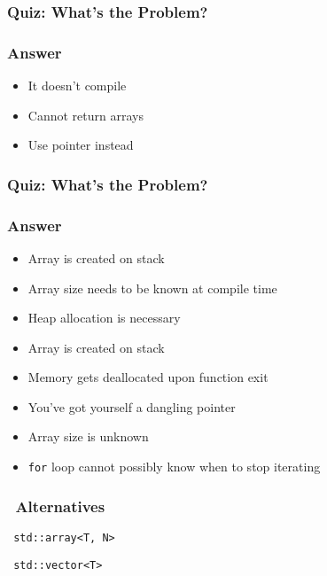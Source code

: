 \documentclass{../ucll-slides}
\begin{document}
\begin{frame}
  \frametitle{Quiz: What's the Problem?}
\end{frame}

\begin{frame}
  \frametitle{Answer}
  \begin{itemize}
    \item It doesn't compile
    \item Cannot return arrays
    \item Use pointer instead
   \end{itemize}
\end{frame}

\begin{frame}
  \frametitle{Quiz: What's the Problem?}
\end{frame}

\begin{frame}
  \frametitle{Answer}
  \begin{itemize}
    \item Array is created on stack
    \item Array size needs to be known at compile time
    \item Heap allocation is necessary
  \end{itemize}
  \vskip5mm
  \begin{itemize}
    \item Array is created on stack
    \item Memory gets deallocated upon function exit
    \item You've got yourself a dangling pointer
  \end{itemize}
  \vskip5mm
  \begin{itemize}
    \item Array size is unknown
    \item {\tt for} loop cannot possibly know when to stop iterating
  \end{itemize}
\end{frame}

\begin{frame}
  \frametitle{\cpp\ Alternatives}
  \begin{center} \tt
    std::array<T, N>
  \end{center}
  \vskip5mm
  \begin{center} \tt
    std::vector<T>
  \end{center}
\end{frame}
\end{document}
